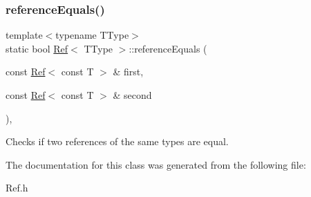 \subsubsection{\texorpdfstring{referenceEquals()}{referenceEquals()}}
{\footnotesize\ttfamily template$<$typename T\+Type$>$ \\
static bool \mbox{\hyperlink{class_ref}{Ref}}$<$ T\+Type $>$\+::reference\+Equals (\begin{DoxyParamCaption}\item[{const \mbox{\hyperlink{class_ref}{Ref}}$<$ const T $>$ \&}]{first,  }\item[{const \mbox{\hyperlink{class_ref}{Ref}}$<$ const T $>$ \&}]{second }\end{DoxyParamCaption})\hspace{0.3cm}{\ttfamily [inline]}, {\ttfamily [static]}}



Checks if two references of the same types are equal. 



The documentation for this class was generated from the following file\+:\begin{DoxyCompactItemize}
\item 
Ref.\+h\end{DoxyCompactItemize}
